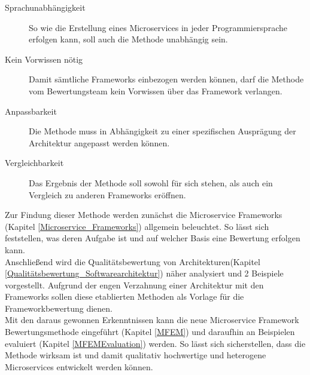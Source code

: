 \begin{description}
	\item[Sprachunabhängigkeit] 
	So wie die Erstellung eines Microservices in jeder Programmiersprache erfolgen kann, soll auch die Methode unabhängig sein.
	\item[Kein Vorwissen nötig] 
	Damit sämtliche Frameworks einbezogen werden können, darf die Methode vom Bewertungsteam kein Vorwissen über das Framework verlangen.
	\item[Anpassbarkeit] 
	Die Methode muss in Abhängigkeit zu einer spezifischen Ausprägung der Architektur angepasst werden können.
	\item[Vergleichbarkeit] 
	Das Ergebnis der Methode soll sowohl für sich stehen, als auch ein Vergleich zu anderen Frameworks eröffnen.
\end{description}

Zur Findung dieser Methode werden zunächst die Microservice Frameworks (Kapitel \ref{Microservice_Frameworks}) allgemein beleuchtet. So lässt sich feststellen, was deren Aufgabe ist und auf welcher Basis eine Bewertung erfolgen kann.\\
Anschließend wird die Qualitätsbewertung von Architekturen(Kapitel \ref{Qualitätsbewertung_Softwarearchitektur}) näher analysiert und 2 Beispiele vorgestellt. Aufgrund der engen Verzahnung einer Architektur mit den Frameworks sollen diese etablierten Methoden als Vorlage für die Frameworkbewertung dienen.\\
Mit den daraus gewonnen Erkenntnissen kann die neue Microservice Framework Bewertungsmethode eingeführt (Kapitel \ref{MFEM}) und daraufhin an Beispielen evaluiert (Kapitel \ref{MFEMEvaluation}) werden. 
So lässt sich sicherstellen, dass die Methode wirksam ist und damit qualitativ hochwertige und heterogene Microservices entwickelt werden können.